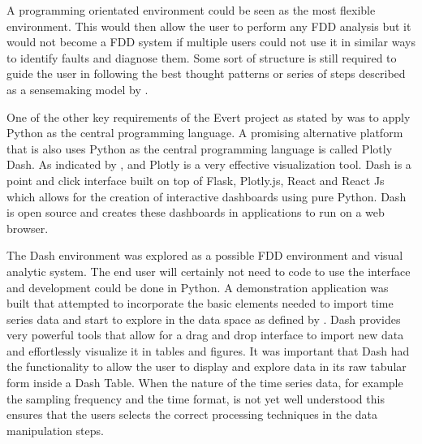 A programming orientated environment could be seen as the most flexible environment. This would then allow the user to perform any FDD analysis but it would not become a FDD system if multiple users could not use it in similar ways to identify faults and diagnose them. Some sort of structure is still required to guide the user in following the best thought patterns or series of steps described as a sensemaking model by \cite{pirolli2005sensemaking}.

One of the other key requirements of the Evert project as stated by \cite{Herbst2017} was to apply Python as the central programming language. A promising alternative platform that is also uses Python as the central programming language is called Plotly Dash. As indicated by \cite{ali2016big}, \cite{caldarola2017big} and \cite{Herbst2017} Plotly is a very effective visualization tool. Dash is a point and click interface built on top of Flask, Plotly.js, React and React Js which allows for the creation of interactive dashboards using pure Python. Dash is open source and creates these dashboards in applications to run on a web browser.

The Dash environment was explored as a possible FDD environment and visual analytic system. The end user will certainly not need to code to use the interface and development could be done in Python. A demonstration application was built that attempted to incorporate the basic elements needed to import time series data and start to explore in the data space as defined by \cite{venkatasubramanian2003review}. Dash provides very powerful tools that allow for a drag and drop interface to import new data and effortlessly visualize it in tables and figures. It was important that Dash had the functionality to allow the user to display and explore data in its raw tabular form inside a Dash Table. When the nature of the time series data, for example the sampling frequency and the time format, is not yet well understood this ensures that the users selects the correct processing techniques in the data manipulation steps.

